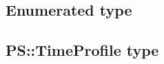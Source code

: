 

\subsection{Enumerated type}
\label{sec:datatype_enum}



\subsection{PS::TimeProfile type}
\label{sec:datatype_timeprofile}





